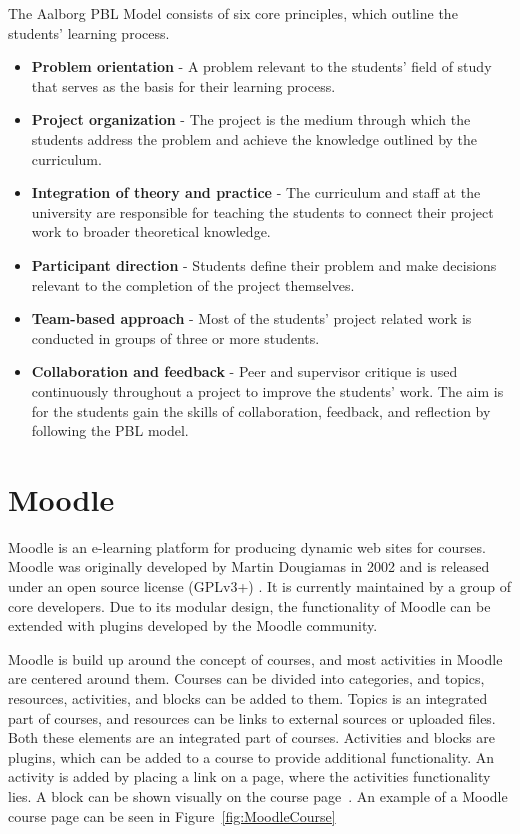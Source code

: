 The Aalborg PBL Model consists of six core principles, which outline the students' learning process.
\begin{itemize}
	\item \textbf{Problem orientation} - A problem relevant to the students' field of study that serves as the basis for their learning process.
	\item \textbf{Project organization} - The project is the medium through which the students address the problem and achieve the knowledge outlined by the curriculum.
	\item \textbf{Integration of theory and practice} - The curriculum and staff at the university are responsible for teaching the students to connect their project work to broader theoretical knowledge.
	\item \textbf{Participant direction} - Students define their problem and make decisions relevant to the completion of the project themselves.
	\item \textbf{Team-based approach} - Most of the students' project related work is conducted in groups of three or more students.
	\item \textbf{Collaboration and feedback} - Peer and supervisor critique is used continuously throughout a project to improve the students' work.
	The aim is for the students gain the skills of collaboration, feedback, and reflection by following the PBL model. 
\end{itemize}

\section{Moodle}
Moodle is an e-learning platform for producing dynamic web sites for courses. 
Moodle was originally developed by Martin Dougiamas in 2002 and is released under an open source license (GPLv3+) \citep{gpl}. 
It is currently maintained by a group of core developers. 
Due to its modular design, the functionality of Moodle can be extended with plugins developed by the Moodle community.

Moodle is build up around the concept of courses, and most activities in Moodle are centered around them. 
Courses can be divided into categories, and topics, resources, activities, and blocks can be added to them. 
Topics is an integrated part of courses, and resources can be links to external sources or uploaded files. 
Both these elements are an integrated part of courses. 
Activities and blocks are plugins, which can be added to a course to provide additional functionality. 
An activity is added by placing a link on a page, where the activities functionality lies. 
A block can be shown visually on the course page~\citep{moodleStructural}.
An example of a Moodle course page can be seen in Figure~\ref{fig:MoodleCourse}

